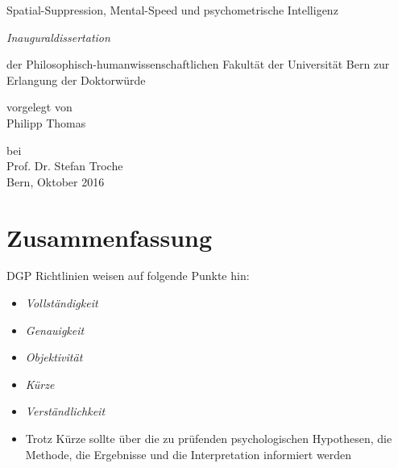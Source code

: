 \documentclass[11pt, twoside, a4paper]{book}		%
\begin{document}
\layout								%
\frontmatter						%




\begin{titlepage}
	
	\vspace*{2cm}
	
	\huge\centering Spatial-Suppression, Mental-Speed und psychometrische Intelligenz 
	
	\noindent\makebox[\textwidth]{\rule{\textwidth}{0.4pt}}
	
	\vspace{1.2cm}
	
	{\centering
		\Large \textit{Inauguraldissertation}
		
		\vspace{1.2cm}
		
		der Philosophisch-humanwissenschaftlichen Fakultät der Universität Bern zur Erlangung der Doktorwürde
		
		\vspace{1cm}
		vorgelegt von\\
		Philipp Thomas
		\vspace{1cm}
		
		bei\\
		Prof. Dr. Stefan Troche\\
		
		\vspace*{\fill}
		\Large Bern, Oktober 2016
		
		
	}

\end{titlepage}
\restoregeometry


\chapter*{Zusammenfassung \label{cha:Zusammenfassung}}
\noindent
DGP Richtlinien weisen auf folgende Punkte hin:
\begin{itemize}
	\item \textit{Vollständigkeit}
	\item \textit{Genauigkeit}
	\item \textit{Objektivität}
	\item \textit{Kürze}
	\item \textit{Verständlichkeit}
	\item Trotz Kürze sollte über die zu prüfenden psychologischen Hypothesen, die Methode, die Ergebnisse
		  und die Interpretation informiert werden
\end{itemize}
\end{document}
